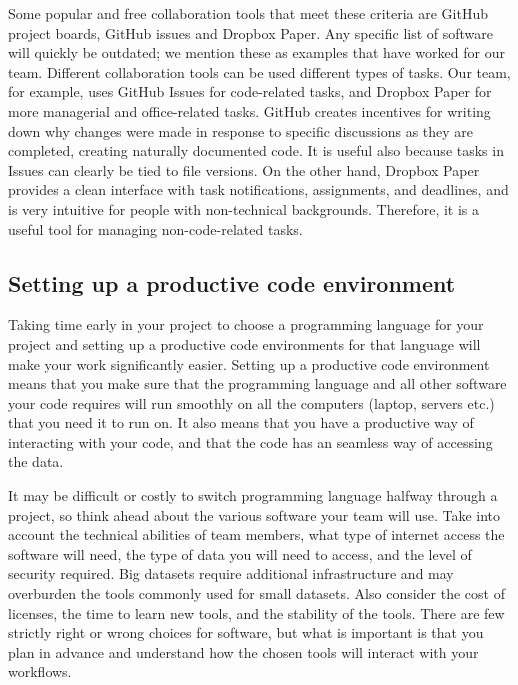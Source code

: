Some popular and free collaboration tools that meet these criteria are
GitHub project boards, GitHub issues and Dropbox Paper.
Any specific list of software will quickly be outdated;
we mention these as examples that have worked for our team.
Different collaboration tools can be used different types of tasks.
Our team, for example, uses GitHub Issues for code-related tasks,
and Dropbox Paper for more managerial and office-related tasks.
GitHub creates incentives for writing down why changes were made
in response to specific discussions
as they are completed, creating naturally documented code.
It is useful also because tasks in Issues can clearly be tied to file versions.
On the other hand, Dropbox Paper provides a clean interface with task notifications,
assignments, and deadlines,
and is very intuitive for people with non-technical backgrounds.
Therefore, it is a useful tool for managing non-code-related tasks.

\subsection{Setting up a productive code environment}

Taking time early in your project to choose a programming language for your project and
setting up a productive code environments for that language
will make your work significantly easier.
Setting up a productive code environment means that
you make sure that the programming language and all other software your code requires
will run smoothly on all the computers (laptop, servers etc.)
that you need it to run on.
It also means that you have a productive way of interacting with your code,
and that the code has an seamless way of accessing the data.

It may be difficult or costly to switch programming language halfway through a project,
so think ahead about the various software your team will use.
Take into account the technical abilities of team members,
what type of internet access the software will need,
the type of data you will need to access,
and the level of security required.
Big datasets require additional infrastructure and may overburden
the tools commonly used for small datasets.
Also consider the cost of licenses, the time to learn new tools,
and the stability of the tools.
There are few strictly right or wrong choices for software,
but what is important is that you plan in advance
and understand how the chosen tools will interact with your workflows.


